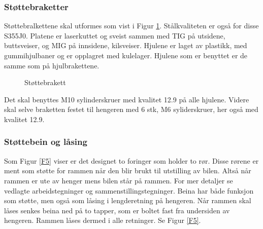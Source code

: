 \subsubsection{Støttebraketter}

Støttebralkettene skal utformes som vist i Figur \ref{F4}. Stålkvaliteten er også for disse S355J0. Platene er laserkuttet og sveist sammen med TIG på utsidene, buttsveiser, og MIG på innsidene, kilsveiser. Hjulene er laget av plastikk, med gummihjulbaner og er opplagret med kulelager. Hjulene som er benyttet er de samme som på hjulbrakettene.

\begin{figure}[H]
\centering   
{}
\caption{Støttebrakett}
\label{F4}
\end{figure}

Det skal benyttes M10 sylinderskruer med kvalitet 12.9 på alle hjulene. Videre skal selve braketten festet til hengeren med 6 stk, M6 syliderskruer, her også med kvalitet 12.9.    

\subsubsection{Støttebein og låsing}

Som Figur \ref{F5} viser er det designet to foringer som holder to rør. Disse rørene er ment som støtte for rammen når den blir brukt til utstilling av bilen. Altså når rammen er ute av henger mens bilen står på rammen. For mer detaljer se vedlagte arbeidstegninger og sammenstillingstegninger. Beina har både funksjon som støtte, men også som låsing i lengderetning på hengeren. Når rammen skal låses senkes beina ned på to tapper, som er boltet fast fra undersiden av hengeren. Rammen låses dermed i alle retninger. Se Figur \ref{F5}.

